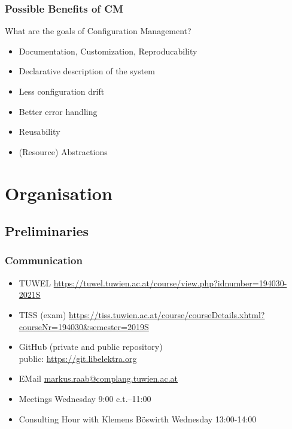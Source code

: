 \begin{frame}
	\frametitle{Possible Benefits of CM}

	\begin{task}
	What are the goals of Configuration Management?
	\end{task}

	\pause

	\begin{itemize}[<+-| alert@+>]
	\item Documentation, Customization, Reproducability
	\item Declarative description of the system
	\item Less configuration drift
	\item Better error handling
	\item Reusability
	\item (Resource) Abstractions
	\end{itemize}
\end{frame}





\section{Organisation}

\subsection{Preliminaries}
\begin{frame}
	\frametitle{Communication}
	\begin{itemize}[<+->]
		\item TUWEL \url{https://tuwel.tuwien.ac.at/course/view.php?idnumber=194030-2021S}
		\item TISS (exam) \url{https://tiss.tuwien.ac.at/course/courseDetails.xhtml?courseNr=194030&semester=2019S}
		\item GitHub (private and public repository) \\ public: \url{https://git.libelektra.org}
		\item EMail \url{markus.raab@complang.tuwien.ac.at}
		\item Meetings Wednesday 9:00 c.t.--11:00
		\item Consulting Hour with Klemens Böswirth Wednesday 13:00-14:00
	\end{itemize}
\end{frame}

